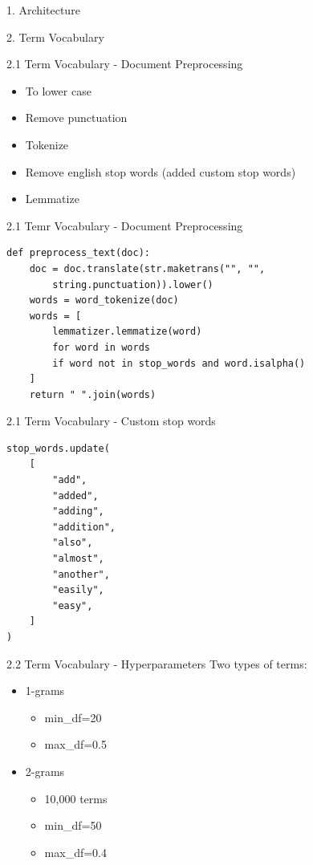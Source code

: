\documentclass{beamer}
\begin{document}
\begin{frame}{1. Architecture}
  \centering
  
\end{frame}

\begin{frame}{2. Term Vocabulary}
\end{frame}

\begin{frame}{2.1 Term Vocabulary - Document Preprocessing}
  \begin{itemize}
    \item To lower case
    \item Remove punctuation
    \item Tokenize
    \item Remove english stop words (added custom stop words)
    \item Lemmatize
  \end{itemize}
\end{frame}

\begin{frame}[fragile]{2.1 Temr Vocabulary - Document Preprocessing}
  \begin{verbatim}
def preprocess_text(doc):
    doc = doc.translate(str.maketrans("", "",
        string.punctuation)).lower()
    words = word_tokenize(doc)
    words = [
        lemmatizer.lemmatize(word)
        for word in words
        if word not in stop_words and word.isalpha()
    ]
    return " ".join(words)
    \end{verbatim}
\end{frame}
\begin{frame}[fragile]{2.1 Term Vocabulary - Custom stop words}
  \begin{verbatim}
stop_words.update(
    [
        "add",
        "added",
        "adding",
        "addition",
        "also",
        "almost",
        "another",
        "easily",
        "easy",
    ]
)
    \end{verbatim}
\end{frame}

\begin{frame}{2.2 Term Vocabulary - Hyperparameters}
  Two types of terms:
  \begin{itemize}
    \item 1-grams
          \begin{itemize}
            \item min\_df=20
            \item max\_df=0.5
          \end{itemize}
    \item 2-grams
          \begin{itemize}
            \item 10,000 terms
            \item min\_df=50
            \item max\_df=0.4
          \end{itemize}
  \end{itemize}

\end{frame}
\end{document}
